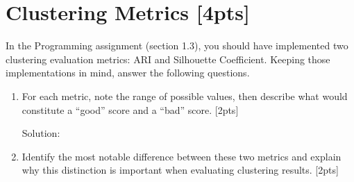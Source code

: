 \section{Clustering Metrics [4pts]}
In the Programming assignment (section 1.3), you should have implemented two clustering evaluation metrics: ARI and Silhouette Coefficient. Keeping those implementations in mind, answer the following questions.

\begin{enumerate}[label=\alph*.]

    \item For each metric, note the range of possible values, then describe what would constitute a ``good'' score and a ``bad'' score. [2pts]

    Solution:
    
    \item Identify the most notable difference between these two metrics and explain why this distinction is important when evaluating clustering results. [2pts]

\end{enumerate}
\newpage